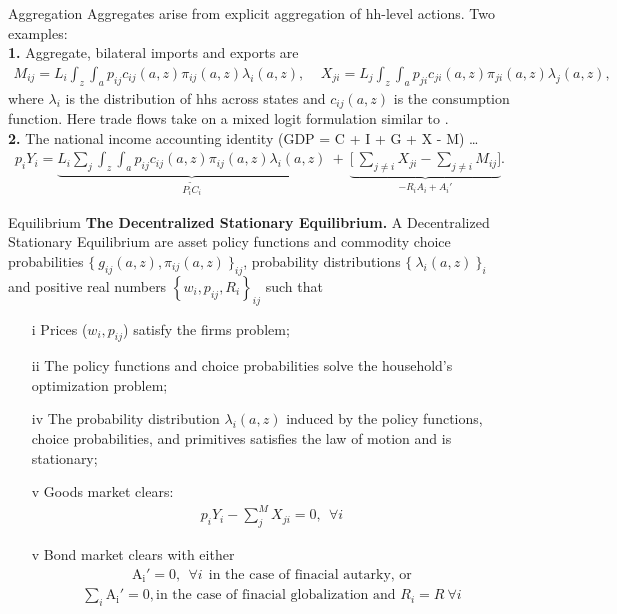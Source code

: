 \documentclass[9pt,pdftex,aspectratio=1610]{beamer}
\theoremstyle{definition}
\begin{document}
\begin{frame}[t]{Aggregation}
\smallskip
Aggregates arise from explicit aggregation of hh-level actions. Two examples:\\
\medskip
\medskip
\textbf{1.} Aggregate, bilateral imports and exports are
\begin{align*}
M_{ij} = L_i \int_{z} \int_{a}  p_{ij} c_{ij}(a, z) \pi_{ij}(a, z) \lambda_i(a, z), \ \ \ \ \ X_{ji} = L_j \int_{z} \int_{a}  p_{ji} c_{ji}(a, z) \pi_{ji}(a, z) \lambda_j(a, z),
\end{align*}
where $\lambda_i$ is the distribution of hhs across states and $c_{ij}(a, z)$ is the consumption function. Here trade flows take on a mixed logit formulation similar to \citet*{berry1995automobile}. \\
\bigskip
\bigskip
\textbf{2.} The national income accounting identity (GDP = C + I + G + X - M) \ldots
\begin{align*}
p_{i} Y_{i}  =  \underbrace{L_{i} \sum_{j} \int_{z} \int_{a}  p_{ij} c_{ij}(a, z) \pi_{ij}(a, z) \lambda_i(a, z)}_{\widetilde{P_{i} C_i}} \ + \ \underbrace{\bigg[\ \sum_{j\neq i}X_{ji} -  \sum_{j\neq i}M_{ij} \bigg]}_{-R_{i}A_i + A_{i}'}.
\end{align*}
\end{frame}

\begin{frame}[t]{Equilibrium}
\smallskip
\textbf{The Decentralized Stationary Equilibrium.} A Decentralized Stationary Equilibrium are asset policy functions and commodity choice probabilities $\{\  g_{ij}(a, z), \pi_{ij}(a, z) \ \}_{ij}$, probability distributions $\{ \ \lambda_i(a, z) \ \}_{i}$ and positive real numbers $\left \{w_i, p_{ij}, R_i\right \}_{ij}$ such that
\begin{itemize}
\smallskip
\item[i]  Prices ($w_i, p_{ij}$) satisfy the firms problem;
\item[ii] The policy functions and choice probabilities solve the household's optimization problem;
\item[iv] The probability distribution $\lambda_i(a, z)$ induced by the policy functions, choice probabilities, and primitives satisfies the law of motion and is stationary;
\item[v] Goods market clears:
\begin{align*}
p_{i} Y_{i} - \sum_{j}^{M}  X_{ji} = 0, \ \ \forall i
\end{align*}
\item[v] Bond market clears with either
\begin{align*}
\mathrm{A_i'} = 0, \ \ \forall i \ \ \mbox{in the case of finacial autarky, or}
\end{align*}
\begin{align*}
\sum_{i}\mathrm{A_i'} = 0, \mbox{in the case of finacial globalization and $R_i = R \ \forall i$}
\end{align*}
\end{itemize}
\end{frame}
\end{document}
